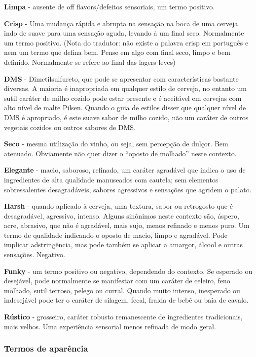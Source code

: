 \textbf{Limpa} - ausente de off flavors/defeitos sensoriais, um termo positivo.

\textbf{Crisp} - Uma mudança rápida e abrupta na sensação na boca de uma cerveja indo de suave para uma sensação aguda, levando à um final seco. Normalmente um termo positivo.
(Nota do tradutor: não existe a palavra crisp em português e nem um termo que defina bem. Pense em algo com final seco, limpo e bem definido. Normalmente se refere ao final das lagers leves)

\textbf{DMS} - Dimetilsulfureto, que pode se apresentar com características bastante diversas. A maioria é inapropriada em qualquer estilo de cerveja, no entanto um sutil caráter de milho cozido pode estar presente e é aceitável em cervejas com alto nível de malte Pilsen. Quando o guia de estilos disser que qualquer nível de DMS é apropriado, é este suave sabor de milho cozido, não um caráter de outros vegetais cozidos ou outros sabores de DMS.

\textbf{Seco} - mesma utilização do vinho, ou seja, sem percepção de dulçor. Bem atenuado. Obviamente não quer dizer o “oposto de molhado” neste contexto.

\textbf{Elegante} - macio, saboroso, refinado, um caráter agradável que indica o uso de ingredientes de alta qualidade manuseados com cautela; sem elementos sobressalentes desagradáveis, sabores agressivos e sensações que agridem o palato.

\textbf{Harsh} - quando aplicado à cerveja, uma textura, sabor ou retrogosto que é desagradável, agressivo, intenso. Alguns sinônimos neste contexto são, áspero, acre, abrasivo, que não é agradável, mais sujo, menos refinado e menos puro. Um termo de qualidade indicando o oposto de macio, limpo e agradável. Pode implicar adstringência, mas pode também se aplicar a amargor, álcool e outras sensações. Negativo.

\textbf{Funky} - um termo positivo ou negativo, dependendo do contexto. Se esperado ou desejável, pode normalmente se manifestar com um caráter de celeiro, feno molhado, sutil terroso, pelego ou curral. Quando muito intenso, inesperado ou indesejável pode ter o caráter de silagem, fecal, fralda de bebê ou baia de cavalo.

\textbf{Rústico} - grosseiro, caráter robusto remanescente de ingredientes tradicionais, mais velhos. Uma experiência sensorial menos refinada de modo geral.

\subsubsection*{Termos de aparência}

